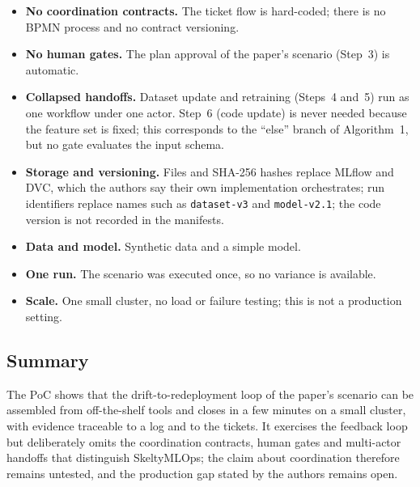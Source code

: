 \begin{itemize}
  \item \textbf{No coordination contracts.} The ticket flow is hard-coded; there is no BPMN process and no contract versioning.
  \item \textbf{No human gates.} The plan approval of the paper's scenario (Step~3) is automatic.
  \item \textbf{Collapsed handoffs.} Dataset update and retraining (Steps~4 and~5) run as one workflow under one actor. Step~6 (code update) is never needed because the feature set is fixed; this corresponds to the ``else'' branch of Algorithm~1, but no gate evaluates the input schema.
  \item \textbf{Storage and versioning.} Files and SHA-256 hashes replace MLflow and DVC, which the authors say their own implementation orchestrates; run identifiers replace names such as \texttt{dataset-v3} and \texttt{model-v2.1}; the code version is not recorded in the manifests.
  \item \textbf{Data and model.} Synthetic data and a simple model.
  \item \textbf{One run.} The scenario was executed once, so no variance is available.
  \item \textbf{Scale.} One small cluster, no load or failure testing; this is not a production setting.
\end{itemize}

\subsection{Summary}

The PoC shows that the drift-to-redeployment loop of the paper's scenario can be assembled from off-the-shelf tools and closes in a few minutes on a small cluster, with evidence traceable to a log and to the tickets. It exercises the feedback loop but deliberately omits the coordination contracts, human gates and multi-actor handoffs that distinguish SkeltyMLOps; the claim about coordination therefore remains untested, and the production gap stated by the authors remains open.
